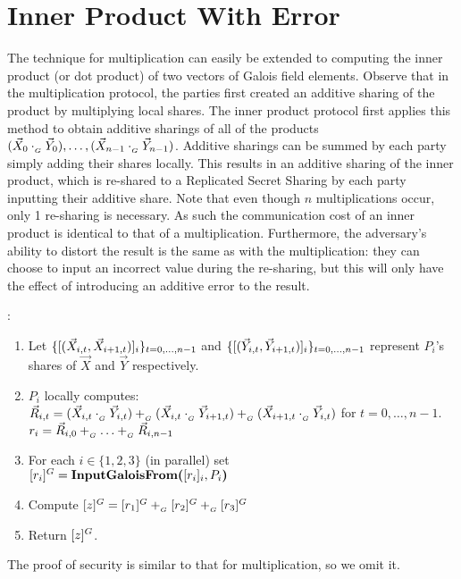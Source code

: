 \section{Inner Product With Error}

The technique for multiplication can easily be extended to computing 
the inner product (or dot product) of two vectors of Galois field elements.
Observe that in the multiplication protocol, 
the parties first created an additive sharing of the product by multiplying local shares.
The inner product protocol first applies this method to obtain additive 
sharings of all of the products 
$(\vec{X}_0 \cdot_{_G} \vec{Y}_0), \ldots, (\vec{X}_{n-1} \cdot_{_G} \vec{Y}_{n-1})$.
Additive sharings can be summed by each party simply adding their shares locally.
This results in an additive sharing of the inner product,
which is re-shared to a Replicated Secret Sharing by each party
inputting their additive share.
Note that even though $n$ multiplications occur, only 1 re-sharing is necessary.
As such the communication cost of an inner product is identical
to that of a multiplication.
Furthermore, the adversary's ability to distort the result is the same
as with the multiplication:
they can choose to input an incorrect value during the re-sharing,
but this will only have the effect of introducing an additive error 
to the result.

\begin{protocol}
	:
	\begin{enumerate}
		\item Let $\{[(\vec{X}_{i,t}, \vec{X}_{i+1,t})]_{i}\}_{t=0,\ldots,n-1}$ and
			$\{[(\vec{Y}_{i,t}, \vec{Y}_{i+1,t})]_{i}\}_{t=0,\ldots,n-1}$
			represent $P_i$'s shares of $\vec{X}$ and $\vec{Y}$
			respectively.
		\item $P_i$ locally computes:\\ 
			$\vec{R}_{i,t} = (\vec{X}_{i,t} \cdot_{_G} \vec{Y}_{i,t}) 
				+_{_G} (\vec{X}_{i,t} \cdot_{_G} \vec{Y}_{i+1,t})
				+_{_G} (\vec{X}_{i+1,t} \cdot_{_G} \vec{Y}_{i,t})$ for $t=0,\ldots,n-1$.\\
			$r_i = \vec{R}_{i,0} +_{_G} \ldots +_{_G} \vec{R}_{i,n-1}$
		\item For each $i \in \{1,2,3\}$ (in parallel) set\\
				$[r_i]^{G} = \textbf{InputGaloisFrom(}[r_i]_{i}, P_{i}\textbf{)}$
		\item Compute $[z]^{G} = [r_1]^{G} +_{_G} [r_2]^{G} +_{_G}
			[r_3]^{G}$
		\item Return $[z]^{G}$.
	\end{enumerate}
\end{protocol}

The proof of security is similar to that for multiplication, so we omit it.
